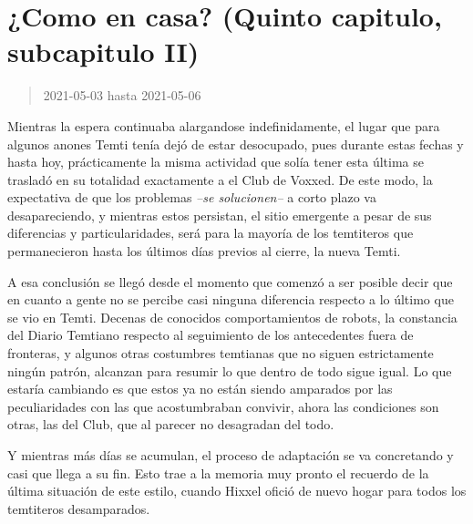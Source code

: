 \documentclass[
  spanish,
]{book}
\begin{document}
\hypertarget{como-en-casa-quinto-capitulo-subcapitulo-ii}{%
\section{¿Como en casa? (Quinto capitulo, subcapitulo II)}\label{como-en-casa-quinto-capitulo-subcapitulo-ii}}

\begin{quote}
2021-05-03 hasta 2021-05-06
\end{quote}

Mientras la espera continuaba alargandose indefinidamente, el lugar que para algunos anones Temti tenía dejó de estar desocupado, pues durante estas fechas y hasta hoy, prácticamente la misma actividad que solía tener esta última se trasladó en su totalidad exactamente a el Club de Voxxed. De este modo, la expectativa de que los problemas \emph{--se solucionen--} a corto plazo va desapareciendo, y mientras estos persistan, el sitio emergente a pesar de sus diferencias y particularidades, será para la mayoría de los temtiteros que permanecieron hasta los últimos días previos al cierre, la nueva Temti.

A esa conclusión se llegó desde el momento que comenzó a ser posible decir que en cuanto a gente no se percibe casi ninguna diferencia respecto a lo último que se vio en Temti. Decenas de conocidos comportamientos de robots, la constancia del Diario Temtiano respecto al seguimiento de los antecedentes fuera de fronteras, y algunos otras costumbres temtianas que no siguen estrictamente ningún patrón, alcanzan para resumir lo que dentro de todo sigue igual. Lo que estaría cambiando es que estos ya no están siendo amparados por las peculiaridades con las que acostumbraban convivir, ahora las condiciones son otras, las del Club, que al parecer no desagradan del todo.

Y mientras más días se acumulan, el proceso de adaptación se va concretando y casi que llega a su fin. Esto trae a la memoria muy pronto el recuerdo de la última situación de este estilo, cuando Hixxel ofició de nuevo hogar para todos los temtiteros desamparados.
\end{document}
